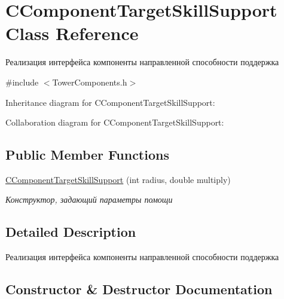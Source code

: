 \hypertarget{classCComponentTargetSkillSupport}{}\section{C\+Component\+Target\+Skill\+Support Class Reference}
\label{classCComponentTargetSkillSupport}


Реализация интерфейса компоненты направленной способности поддержка  




{\ttfamily \#include $<$Tower\+Components.\+h$>$}



Inheritance diagram for C\+Component\+Target\+Skill\+Support\+:


Collaboration diagram for C\+Component\+Target\+Skill\+Support\+:
\subsection*{Public Member Functions}
\begin{DoxyCompactItemize}
\item 
\hyperlink{classCComponentTargetSkillSupport_aa5994656f2535ce1603f84f3371f13e5}{C\+Component\+Target\+Skill\+Support} (int radius, double multiply)
\begin{DoxyCompactList}\small\item\em Конструктор, задающий параметры помощи \end{DoxyCompactList}\end{DoxyCompactItemize}


\subsection{Detailed Description}
Реализация интерфейса компоненты направленной способности поддержка 

\subsection{Constructor \& Destructor Documentation}
